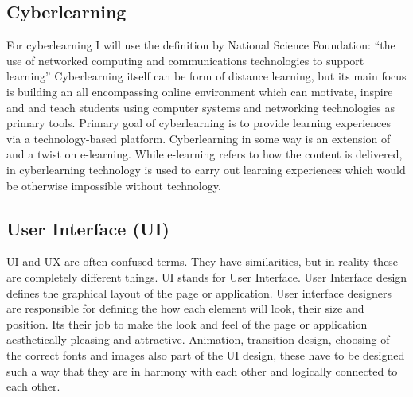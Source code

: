 \documentclass[10pt,twoside,english,a4paper]{article}
\begin{document}
\subsection{Cyberlearning}
For cyberlearning I will use the definition by National Science Foundation: 
``the use of networked computing and communications technologies to support learning” \cite{borgman_2017_fostering} 
Cyberlearning itself can be form of distance learning, but its main focus is building an all 
encompassing online environment which can motivate, inspire and and teach students using 
computer systems and networking technologies as primary tools. \cite{ui/ux}
Primary goal of cyberlearning is to provide learning experiences via a technology-based platform. 
Cyberlearning in some way is an extension of and a twist on e-learning.\cite{lynch_2020_cyberlearning}
While e-learning refers to how the content is delivered, in cyberlearning technology
is used to carry out learning experiences which would be otherwise impossible without technology.\cite{lynch_2020_cyberlearning}


\subsection{User Interface (UI)}
UI and UX are often confused terms. \cite{theymakedesign_2019_what} They have similarities, but in reality
these are completely different things.
UI stands for User Interface. User Interface design defines the graphical layout of the page or application.
User interface designers are responsible for defining the how each element will look, their size and position.
Its their job to make the look and feel of the page or application aesthetically pleasing and 
attractive. Animation, transition design, choosing of the correct fonts and images also part of the UI design, 
these have to be designed such a way that they are in harmony with each other and logically connected to each other.
\cite{theymakedesign_2019_what}
\end{document}
